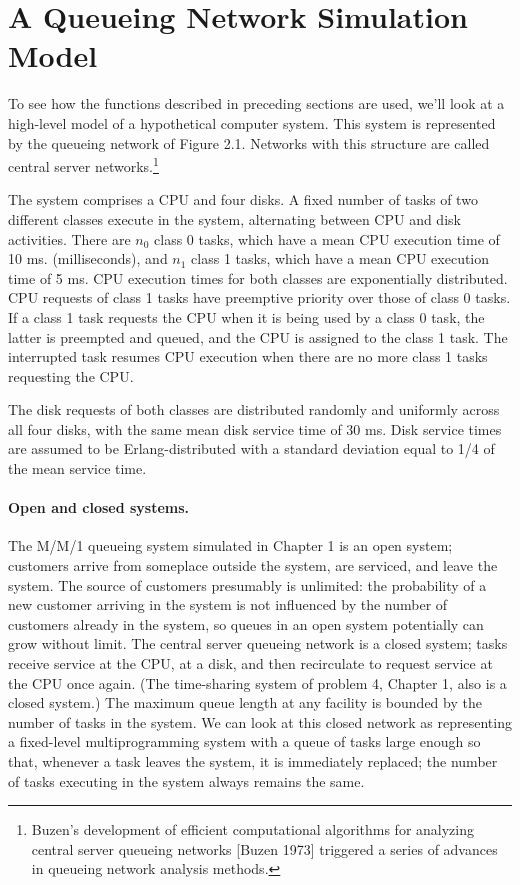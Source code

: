 \section{A Queueing Network Simulation Model}
\label{sec:smpl-queueing-network-simulation-model}

To see how the functions described in preceding sections are used, we'll look
at a high-level model of a hypothetical computer system. This system is
represented by the queueing network of Figure 2.1. Networks with this
structure are called central server networks.\footnote{Buzen's development of
efficient computational algorithms for analyzing central server queueing
networks [Buzen 1973] triggered a series of advances in queueing network
analysis methods.}

The system comprises a CPU and four disks. A fixed number of tasks of two
different classes execute in the system, alternating between CPU and disk
activities. There are $n_0$ class 0 tasks, which have a mean CPU execution time
of 10 ms. (milliseconds), and $n_1$ class 1 tasks, which have a mean CPU execution time of
5 ms. CPU execution times for both classes are exponentially distributed. CPU
requests of class 1 tasks have preemptive priority over those of class 0 tasks.
If a class 1 task requests the CPU when it is being used by a class 0 task, the
latter is preempted and queued, and the CPU is assigned to the class 1 task.
The interrupted task resumes CPU execution when there are no more class 1
tasks requesting the CPU.

The disk requests of both classes are distributed randomly and uniformly
across all four disks, with the same mean disk service time of 30 ms. Disk
service times are assumed to be Erlang-distributed with a standard deviation
equal to 1/4 of the mean service time.

\paragraph{Open and closed systems.}
The M/M/1 queueing system simulated in Chapter 1 is an open system; customers
arrive from someplace outside the system, are serviced, and leave the system.
The source of customers presumably is unlimited: the probability of a new
customer arriving in the system is not influenced by the number of customers
already in the system, so queues in an open system potentially can grow
without limit. The central server queueing network is a closed system; tasks
receive service at the CPU, at a disk, and then recirculate to request service
at the CPU once again. (The time-sharing system of problem 4, Chapter 1, also
is a closed system.) The maximum queue length at any facility is bounded by
the number of tasks in the system. We can look at this closed network as
representing a fixed-level multiprogramming system with a queue of tasks large
enough so that, whenever a task leaves the system, it is immediately replaced;
the number of tasks executing in the system always remains the same.

